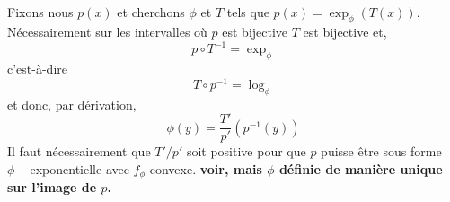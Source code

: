 \documentclass[10pt,a4paper]{article}
\begin{document}
\

Fixons   nous  $p(x)$   et   cherchons  $\phi$   et   $T$  tels   que  $p(x)   =
\exp_\phi(T(x))$. N\'ecessairement  sur les  intervalles o\`u $p$  est bijective
$T$ est  bijective et, $$p \circ  T^{-1} = \exp_\phi$$  c'est-\`a-dire $$T \circ
p^{-1}    =   \log_\phi$$    et    donc,   par    d\'erivation,   $$\phi(y)    =
\frac{T'}{p'}(p^{-1}(y))$$  Il faut n\'ecessairement  que $T'/p'$  soit positive
pour  que  $p$  puisse  \^etre  sous forme  $\phi-$exponentielle  avec  $f_\phi$
convexe. {\bf  voir, mais  $\phi$ d\'efinie de  mani\`ere unique sur  l'image de
  $p$.}



\end{document}
